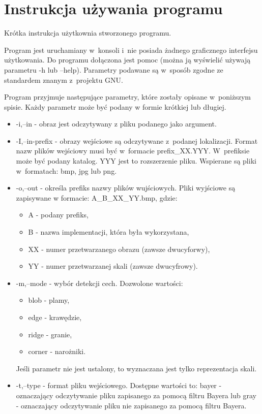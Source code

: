 \chapter{Instrukcja używania programu}
\label{cha:instrukcja}

Krótka instrukcja użytkownia stworzonego programu.

Program jest uruchamiany w~konsoli i~nie posiada żadnego graficznego interfejsu użytkowania. Do programu dołączona jest pomoc (można ją wyświelić używają parametru -h lub --help). Parametry podawane są w~sposób zgodne ze standardem znanym z~projektu GNU.

Program przyjmuje następujące parametry, które zostały opisane w~poniższym spisie. Każdy parametr może być podany w formie krótkiej lub długiej.

\begin{itemize}
\item -i,--in - obraz jest odczytywany z pliku podanego jako argument.
\item -I,--in-prefix - obrazy wejściowe są odczytywane z~podanej lokalizacji. Format nazw plików wejściowy musi być w~formacie prefix\_XX.YYY. W~prefiksie może być podany katalog. YYY jest to rozszerzenie pliku. Wspierane są pliki w~formatach: bmp, jpg lub png.
\item -o,--out - określa prefiks nazwy plików wujściowych. Pliki wyjściowe są zapisywane w formacie: A\_B\_XX\_YY.bmp, gdzie:
	\begin{itemize}
		\item A - podany prefiks,
		\item B - nazwa implementacji, która była wykorzystana,
		\item XX - numer przetwarzanego obrazu (zawsze dwucyforwy),
		\item YY - numer przetwarzanej skali (zawsze dwucyfrowy).
	\end{itemize}
\item -m,--mode - wybór detekcji cech. Dozwolone wartości:
	\begin{itemize}
		\item blob - plamy,
		\item edge - krawędzie,
		\item ridge - granie,
		\item corner - narożniki.
	\end{itemize}
	Jeśli parametr nie jest ustalony, to wyznaczana jest tylko reprezentacja skali.
\item -t,--type - format pliku wejściowego. Dostępne wartości to: bayer - oznaczający odczytywanie pliku zapisanego za pomocą filtru Bayera lub gray - oznaczający odczytywanie pliku nie zapisanego za pomocą filtru Bayera.

\end{itemize}
